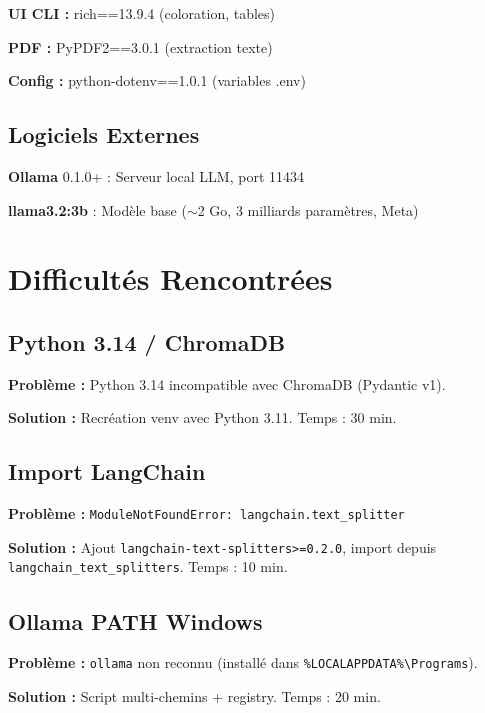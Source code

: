 \documentclass[12pt,a4paper]{report}
\begin{document}
\textbf{UI CLI :} rich==13.9.4 (coloration, tables)

\textbf{PDF :} PyPDF2==3.0.1 (extraction texte)

\textbf{Config :} python-dotenv==1.0.1 (variables .env)

\section{Logiciels Externes}

\textbf{Ollama} 0.1.0+ : Serveur local LLM, port 11434

\textbf{llama3.2:3b} : Modèle base ($\sim$2 Go, 3 milliards paramètres, Meta)

\chapter{Difficultés Rencontrées}

\section{Python 3.14 / ChromaDB}

\textbf{Problème :} Python 3.14 incompatible avec ChromaDB (Pydantic v1).

\textbf{Solution :} Recréation venv avec Python 3.11. Temps : 30 min.

\section{Import LangChain}

\textbf{Problème :} \texttt{ModuleNotFoundError: langchain.text\_splitter}

\textbf{Solution :} Ajout \texttt{langchain-text-splitters>=0.2.0}, import depuis \texttt{langchain\_text\_splitters}. Temps : 10 min.

\section{Ollama PATH Windows}

\textbf{Problème :} \texttt{ollama} non reconnu (installé dans \texttt{\%LOCALAPPDATA\%\textbackslash Programs}).

\textbf{Solution :} Script multi-chemins + registry. Temps : 20 min.
\end{document}
